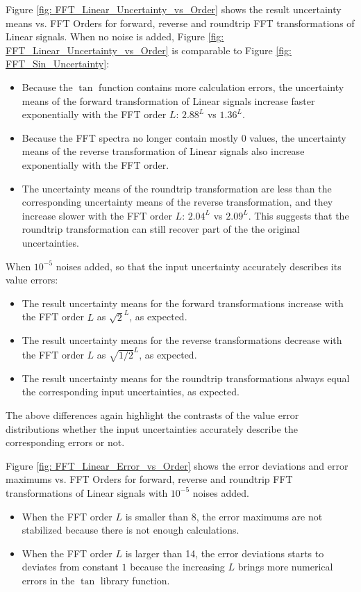 \documentclass[twoside]{article}
\numberwithin{equation}{section}
\begin{document}
Figure \ref{fig: FFT_Linear_Uncertainty_vs_Order} shows the result uncertainty means vs. FFT Orders for forward, reverse and roundtrip FFT transformations of Linear signals.
When no noise is added, Figure \ref{fig: FFT_Linear_Uncertainty_vs_Order} is comparable to Figure \ref{fig: FFT_Sin_Uncertainty}: 
\begin{itemize}
\item Because the $\tan$ function contains more calculation errors, the uncertainty means of the forward transformation of Linear signals increase faster exponentially with the FFT order $L$: $2.88^L$ vs $1.36^L$.

\item Because the FFT spectra no longer contain mostly $0$ values, the uncertainty means of the reverse transformation of Linear signals also increase exponentially with the FFT order.

\item The uncertainty means of the roundtrip transformation are less than the corresponding uncertainty means of the reverse transformation, and they increase slower with the FFT order $L$: $2.04^L$ vs $2.09^L$.  
This suggests that the roundtrip transformation can still recover part of the the original uncertainties.
\end{itemize}
When $10^{-5}$ noises added, so that the input uncertainty accurately describes its value errors:
\begin{itemize}
\item The result uncertainty means for the forward transformations increase with the FFT order $L$ as $\sqrt{2}^L$, as expected.

\item The result uncertainty means for the reverse transformations decrease with the FFT order $L$ as $\sqrt{1/2}^L$, as expected.

\item The result uncertainty means for the roundtrip transformations always equal the corresponding input uncertainties, as expected.
\end{itemize}
The above differences again highlight the contrasts of the value error distributions whether the input uncertainties accurately describe the corresponding errors or not.

Figure \ref{fig: FFT_Linear_Error_vs_Order} shows the error deviations and error maximums vs. FFT Orders for forward, reverse and roundtrip FFT transformations of Linear signals with $10^{-5}$ noises added.
\begin{itemize}
\item When the FFT order $L$ is smaller than 8, the error maximums are not stabilized because there is not enough calculations.

\item When the FFT order $L$ is larger than 14, the error deviations starts to deviates from constant $1$ because the increasing $L$ brings more numerical errors in the $\tan$ library function.

\end{itemize}
\end{document}
